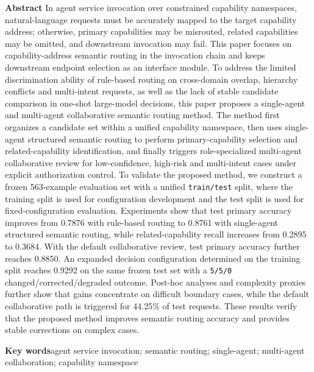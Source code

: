 \documentclass[10pt,a4paper,twocolumn,fontset=fandol]{ctexart}
\begin{document}
\noindent\textbf{Abstract}\quad
In agent service invocation over constrained capability namespaces, natural-language requests must be accurately mapped to the target capability address; otherwise, primary capabilities may be misrouted, related capabilities may be omitted, and downstream invocation may fail. This paper focuses on capability-address semantic routing in the invocation chain and keeps downstream endpoint selection as an interface module. To address the limited discrimination ability of rule-based routing on cross-domain overlap, hierarchy conflicts and multi-intent requests, as well as the lack of stable candidate comparison in one-shot large-model decisions, this paper proposes a single-agent and multi-agent collaborative semantic routing method. The method first organizes a candidate set within a unified capability namespace, then uses single-agent structured semantic routing to perform primary-capability selection and related-capability identification, and finally triggers role-specialized multi-agent collaborative review for low-confidence, high-risk and multi-intent cases under explicit authorization control. To validate the proposed method, we construct a frozen 563-example evaluation set with a unified \texttt{train/test} split, where the training split is used for configuration development and the test split is used for fixed-configuration evaluation. Experiments show that test primary accuracy improves from 0.7876 with rule-based routing to 0.8761 with single-agent structured semantic routing, while related-capability recall increases from 0.2895 to 0.3684. With the default collaborative review, test primary accuracy further reaches 0.8850. An expanded decision configuration determined on the training split reaches 0.9292 on the same frozen test set with a \texttt{5/5/0} changed/corrected/degraded outcome. Post-hoc analyses and complexity proxies further show that gains concentrate on difficult boundary cases, while the default collaborative path is triggered for 44.25\% of test requests. These results verify that the proposed method improves semantic routing accuracy and provides stable corrections on complex cases.

\vspace{0.35em}
\noindent\textbf{Key words}\quad agent service invocation; semantic routing; single-agent; multi-agent collaboration; capability namespace
\end{document}
